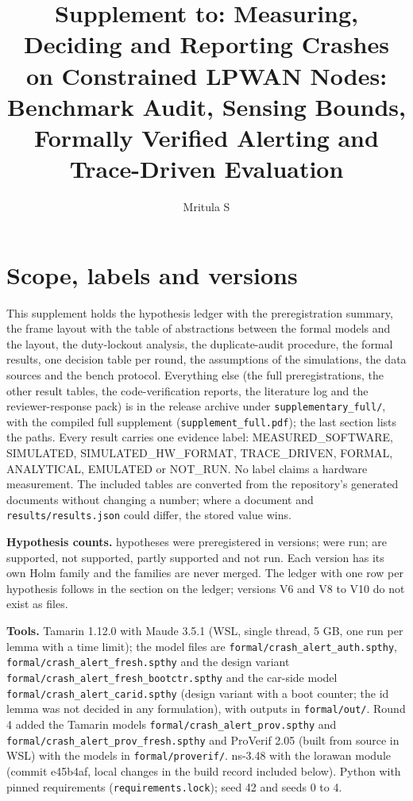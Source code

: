 \documentclass[10pt,a4paper]{article}
\title{Supplement to: Measuring, Deciding and Reporting Crashes on Constrained LPWAN Nodes: Benchmark Audit, Sensing Bounds, Formally Verified Alerting and Trace-Driven Evaluation}
\author{Mritula S}
\date{}
\begin{document}
\maketitle
\tableofcontents

\section{Scope, labels and versions}
This supplement holds the hypothesis ledger with the preregistration summary, the frame layout with the table of abstractions between the formal models and the layout, the duty-lockout analysis, the duplicate-audit procedure, the formal results, one decision table per round, the assumptions of the simulations, the data sources and the bench protocol. Everything else (the full preregistrations, the other result tables, the code-verification reports, the literature log and the reviewer-response pack) is in the release archive under \texttt{supplementary\_full/}, with the compiled full supplement (\texttt{supplement\_full.pdf}); the last section lists the paths. Every result carries one evidence label: MEASURED\_SOFTWARE, SIMULATED, SIMULATED\_HW\_FORMAT, TRACE\_DRIVEN, FORMAL, ANALYTICAL, EMULATED or NOT\_RUN. No label claims a hardware measurement. The included tables are converted from the repository's generated documents without changing a number; where a document and \texttt{results/results.json} could differ, the stored value wins.

\textbf{Hypothesis counts.} \LedgerN{} hypotheses were preregistered in \LedgerVersions{} versions; \LedgerRun{} were run; \LedgerSupp{} are supported, \LedgerNot{} not supported, \LedgerPartly{} partly supported and \LedgerNotRun{} not run. Each version has its own Holm family and the families are never merged. The ledger with one row per hypothesis follows in the section on the ledger; versions V6 and V8 to V10 do not exist as files.

\textbf{Tools.} Tamarin 1.12.0 with Maude 3.5.1 (WSL, single thread, 5 GB, one run per lemma with a time limit); the model files are \texttt{formal/crash\_alert\_auth.spthy}, \texttt{formal/crash\_alert\_fresh.spthy} and the design variant \texttt{formal/crash\_alert\_fresh\_bootctr.spthy} and the car-side model \texttt{formal/crash\_alert\_carid.spthy} (design variant with a boot counter; the id lemma was not decided in any formulation), with outputs in \texttt{formal/out/}. Round 4 added the Tamarin models \texttt{formal/crash\_alert\_prov.spthy} and \texttt{formal/crash\_alert\_prov\_fresh.spthy} and ProVerif 2.05 (built from source in WSL) with the models in \texttt{formal/proverif/}. ns-3.48 with the lorawan module (commit e45b4af, local changes in the build record included below). Python with pinned requirements (\texttt{requirements.lock}); seed 42 and seeds 0 to 4.
\end{document}
